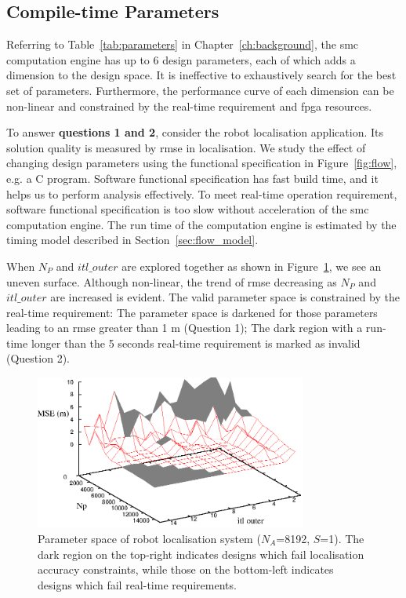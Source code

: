 \subsection{Compile-time Parameters}
\label{sec:flow_parameters}

Referring to Table~\ref{tab:parameters} in Chapter~\ref{ch:background}, the \gls{smc} computation engine has up to 6 design parameters, each of which adds a dimension to the design space.
It is ineffective to exhaustively search for the best set of parameters.
Furthermore, the performance curve of each dimension can be non-linear and constrained by the real-time requirement and \gls{fpga} resources.

To answer \textbf{questions 1 and 2}, consider the robot localisation application.
Its solution quality is measured by \gls{rmse} in localisation.
We study the effect of changing design parameters using the functional specification in Figure~\ref{fig:flow}, e.g. a C program.
Software functional specification has fast build time, and it helps us to perform analysis effectively.
To meet real-time operation requirement, software functional specification is too slow without acceleration of the \gls{smc} computation engine.
The run time of the computation engine is estimated by the timing model described in Section~\ref{sec:flow_model}.

When $N_P$ and $itl\_outer$ are explored together as shown in Figure~\ref{fig:mcl_2d}, we see an uneven surface.
Although non-linear, the trend of  \gls{rmse} decreasing as $N_P$ and $itl\_outer$ are increased is evident.
The valid parameter space is constrained by the real-time requirement:
The parameter space is darkened for those parameters leading to an \gls{rmse} greater than 1 m (Question 1);
The dark region with a run-time longer than the 5 seconds real-time requirement is marked as invalid (Question 2).

\begin{figure}[t!]
\begin{center}
\includegraphics[width=0.8\textwidth]{5_tool/figures/fig_mcl_2d}
\end{center}
\caption{Parameter space of robot localisation system ($N_A$=8192, $S$=1). The dark region on the top-right indicates designs which fail localisation accuracy constraints, while those on the bottom-left indicates designs which fail real-time requirements.}
\label{fig:mcl_2d}
\end{figure}

